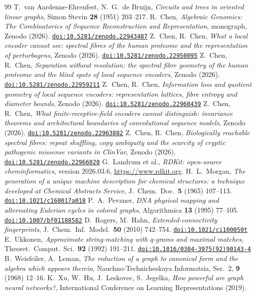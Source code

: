 \documentclass[11pt]{article}
\newcommand{\doi}[1]{\href{https://doi.org/#1}{\nolinkurl{doi:#1}}}
\theoremstyle{plain}
\theoremstyle{definition}
\theoremstyle{remark}
\begin{document}
\begin{thebibliography}{99}
 T.~van Aardenne-Ehrenfest, N.~G.~de Bruijn, \emph{Circuits and trees in oriented linear
graphs}, Simon Stevin \textbf{28} (1951) 203--217.
 R.~Chen, \emph{Algebraic Genomics: The Combinatorics of Sequence Reconstruction and
Representation}, monograph, Zenodo (2026). \doi{10.5281/zenodo.22943487}
 Z.~Chen, R.~Chen, \emph{What a local encoder cannot see: spectral fibres of the human proteome
and the representation of perturbagens}, Zenodo (2026). \doi{10.5281/zenodo.22950095}
 Z.~Chen, R.~Chen, \emph{Separation without resolution: the spectral fibre geometry of the human
proteome and the blind spots of local sequence encoders}, Zenodo (2026). \doi{10.5281/zenodo.22959211}
 Z.~Chen, R.~Chen, \emph{Information loss and quotient geometry of local sequence encoders:
representation lattices, fibre entropy and diameter bounds}, Zenodo (2026). \doi{10.5281/zenodo.22960439}
 Z.~Chen, R.~Chen, \emph{What finite-receptive-field encoders cannot distinguish: invariance
theorems and architectural boundaries of convolutional sequence models}, Zenodo (2026).
\doi{10.5281/zenodo.22963882}
 Z.~Chen, R.~Chen, \emph{Biologically reachable spectral fibres: repeat shuffling, copy
ambiguity and the scarcity of cryptic pathogenic missense variants in ClinVar}, Zenodo (2026).
\doi{10.5281/zenodo.22966020}
 G.~Landrum et al., \emph{RDKit: open-source cheminformatics}, version 2026.03.6,
\url{https://www.rdkit.org}.
 H.~L.~Morgan, \emph{The generation of a unique machine description for chemical
structures: a technique developed at Chemical Abstracts Service}, J.\ Chem.\ Doc.\ \textbf{5} (1965) 107--113.
\doi{10.1021/c160017a018}
 P.~A.~Pevzner, \emph{DNA physical mapping and alternating Eulerian cycles in colored
graphs}, Algorithmica \textbf{13} (1995) 77--105. \doi{10.1007/bf01188582}
 D.~Rogers, M.~Hahn, \emph{Extended-connectivity fingerprints}, J.\ Chem.\ Inf.\ Model.\
\textbf{50} (2010) 742--754. \doi{10.1021/ci100050t}
 E.~Ukkonen, \emph{Approximate string-matching with $q$-grams and maximal matches},
Theoret.\ Comput.\ Sci.\ \textbf{92} (1992) 191--211. \doi{10.1016/0304-3975(92)90143-4}
\bibitem{WL68} B.~Weisfeiler, A.~Leman, \emph{The reduction of a graph to canonical form and the algebra which
appears therein}, Nauchno-Technicheskaya Informatsia, Ser.~2, \textbf{9} (1968) 12--16.
\bibitem{GIN} K.~Xu, W.~Hu, J.~Leskovec, S.~Jegelka, \emph{How powerful are graph neural networks?},
International Conference on Learning Representations (2019).
\end{thebibliography}
\end{document}
